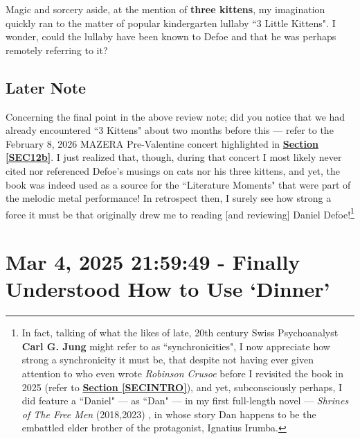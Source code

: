 \documentclass[a4paper]{article}
\begin{document}
Magic and sorcery aside, at the mention of \textbf{three kittens}, my imagination quickly ran to the matter of popular kindergarten lullaby ``3 Little Kittens". I wonder, could the lullaby have been known to Defoe and that he was perhaps remotely referring to it?


\subsection{Later Note}
\label{SEC26a}

Concerning the final point in the above review note; did you notice that we had already encountered ``3 Kittens" about two months before this --- refer to the February 8, 2026 MAZERA Pre-Valentine concert highlighted in \textbf{\hyperref[SEC12b]{Section \ref{SEC12b}}}. I just realized that, though, during that concert I most likely never cited nor referenced Defoe's musings on cats nor his three kittens, and yet, the book was indeed used as a source for the ``Literature Moments" that were part of the melodic metal performance! In retrospect then, I surely see how strong a force it must be that originally drew me to reading [and reviewing] Daniel Defoe!\footnote{In fact, talking of what the likes of late, 20th century Swiss Psychoanalyst \textbf{Carl G. Jung} might refer to as ``synchronicities", I now appreciate how strong a synchronicity it must be, that despite not having ever given attention to who even wrote \textit{Robinson Crusoe} before I revisited the book in 2025 (refer to \textbf{\hyperref[SECINTRO]{Section \ref{SECINTRO}}}), and yet, subconsciously perhaps, I did feature a ``Daniel" --- as ``Dan" --- in my first full-length novel --- \textit{Shrines of The Free Men} (2018,2023) \cite{shrinesjwl}, in whose story Dan happens to be the embattled elder brother of the protagonist, Ignatius Irumba.}





\section{Mar 4, 2025 21:59:49 - Finally Understood How to Use `Dinner'}
\label{SEC27}
\end{document}
